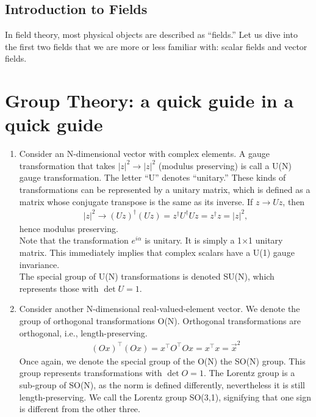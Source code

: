 \documentclass[a4paper,11pt]{article}
\numberwithin{equation}{section}
\theoremstyle{definition}
\begin{document}
\subsection{Introduction to Fields}
In field theory, most physical objects are described as ``fields.'' Let us dive into the first two fields that we are more or less familiar with: scalar fields and vector fields. 

\newpage
\section{Group Theory: a quick guide in a quick guide}
\begin{enumerate}
	\item Consider an N-dimensional vector with complex elements. A gauge transformation that takes $\vert z\vert^2 \to \vert z \vert^2$ (modulus preserving) is call a U(N) gauge transformation. The letter ``U'' denotes ``unitary.'' These kinds of transformations can be represented by a unitary matrix, which is defined as a matrix whose conjugate transpose is the same as its inverse. If $z\to Uz$, then 
	\begin{align*}
	\vert z\vert^2 \to (Uz)^\dagger(Uz) = z^\dagger U^\dagger U z =z^\dagger z =\vert z\vert^2,
	\end{align*} 
	hence modulus preserving.\\
	
	Note that the transformation $e^{i\alpha}$ is unitary. It is simply a 1$\times$1 unitary matrix. This immediately implies that complex scalars have a U(1) gauge invariance.\\
	
	The special group of U(N) transformations is denoted SU(N), which represents those with $\det U= 1$. 
	\item Consider another N-dimensional real-valued-element vector. We denote the group of orthogonal transformations O(N). Orthogonal transformations are orthogonal, i.e., length-preserving. 
	\begin{align*}
	(Ox)^\top(Ox) = x^\top O^\top O x = x^\top x = \vec{x}^2
	\end{align*} 
	Once again, we denote the special group of the O(N) the SO(N) group. This group represents transformations with $\det O = 1$. The Lorentz group is a sub-group of SO(N), as the norm is defined differently, nevertheless it is still length-preserving. We call the Lorentz group SO(3,1), signifying that one sign is different from the other three. 
\end{enumerate}
\end{document}
